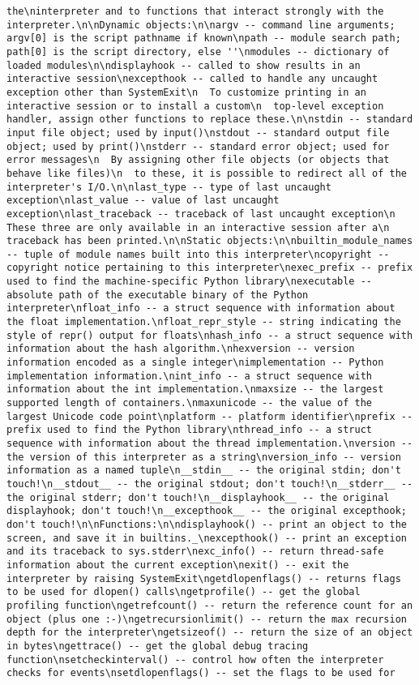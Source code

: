 \documentclass[11pt]{article}
\begin{document}
\begin{verbatim}
the\ninterpreter and to functions that interact strongly with the interpreter.\n\nDynamic objects:\n\nargv -- command line arguments; argv[0] is the script pathname if known\npath -- module search path; path[0] is the script directory, else ''\nmodules -- dictionary of loaded modules\n\ndisplayhook -- called to show results in an interactive session\nexcepthook -- called to handle any uncaught exception other than SystemExit\n  To customize printing in an interactive session or to install a custom\n  top-level exception handler, assign other functions to replace these.\n\nstdin -- standard input file object; used by input()\nstdout -- standard output file object; used by print()\nstderr -- standard error object; used for error messages\n  By assigning other file objects (or objects that behave like files)\n  to these, it is possible to redirect all of the interpreter's I/O.\n\nlast_type -- type of last uncaught exception\nlast_value -- value of last uncaught exception\nlast_traceback -- traceback of last uncaught exception\n  These three are only available in an interactive session after a\n  traceback has been printed.\n\nStatic objects:\n\nbuiltin_module_names -- tuple of module names built into this interpreter\ncopyright -- copyright notice pertaining to this interpreter\nexec_prefix -- prefix used to find the machine-specific Python library\nexecutable -- absolute path of the executable binary of the Python interpreter\nfloat_info -- a struct sequence with information about the float implementation.\nfloat_repr_style -- string indicating the style of repr() output for floats\nhash_info -- a struct sequence with information about the hash algorithm.\nhexversion -- version information encoded as a single integer\nimplementation -- Python implementation information.\nint_info -- a struct sequence with information about the int implementation.\nmaxsize -- the largest supported length of containers.\nmaxunicode -- the value of the largest Unicode code point\nplatform -- platform identifier\nprefix -- prefix used to find the Python library\nthread_info -- a struct sequence with information about the thread implementation.\nversion -- the version of this interpreter as a string\nversion_info -- version information as a named tuple\n__stdin__ -- the original stdin; don't touch!\n__stdout__ -- the original stdout; don't touch!\n__stderr__ -- the original stderr; don't touch!\n__displayhook__ -- the original displayhook; don't touch!\n__excepthook__ -- the original excepthook; don't touch!\n\nFunctions:\n\ndisplayhook() -- print an object to the screen, and save it in builtins._\nexcepthook() -- print an exception and its traceback to sys.stderr\nexc_info() -- return thread-safe information about the current exception\nexit() -- exit the interpreter by raising SystemExit\ngetdlopenflags() -- returns flags to be used for dlopen() calls\ngetprofile() -- get the global profiling function\ngetrefcount() -- return the reference count for an object (plus one :-)\ngetrecursionlimit() -- return the max recursion depth for the interpreter\ngetsizeof() -- return the size of an object in bytes\ngettrace() -- get the global debug tracing function\nsetcheckinterval() -- control how often the interpreter checks for events\nsetdlopenflags() -- set the flags to be used for 
\end{verbatim}
\end{document}
